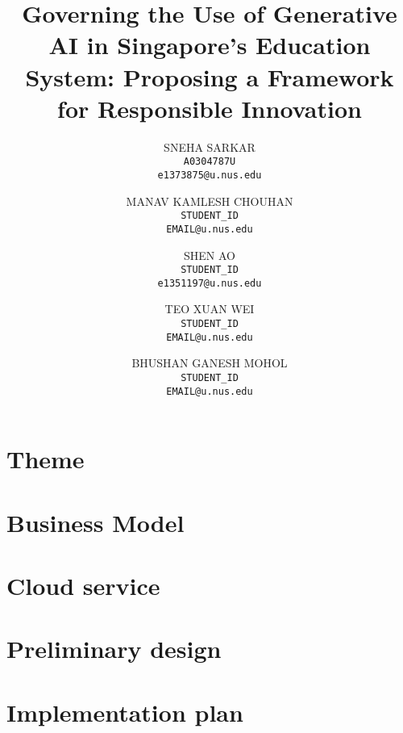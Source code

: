 \documentclass[11pt]{article}
\title{Governing the Use of Generative AI in Singapore's Education System: Proposing a Framework for Responsible Innovation
}
\author{
    \begin{tabular}[t]{l}
        SNEHA SARKAR \\
        \texttt{A0304787U} \\
        \texttt{e1373875@u.nus.edu} \\
    \end{tabular}
    \and
    \begin{tabular}[t]{l}
        MANAV KAMLESH CHOUHAN \\
        \texttt{STUDENT\_ID} \\
        \texttt{EMAIL@u.nus.edu} \\
    \end{tabular}
    \and
    \begin{tabular}[t]{l}
        SHEN AO \\
        \texttt{STUDENT\_ID} \\
        \texttt{e1351197@u.nus.edu} \\
    \end{tabular}
    \and
    \begin{tabular}[t]{l}
        TEO XUAN WEI \\
        \texttt{STUDENT\_ID} \\
        \texttt{EMAIL@u.nus.edu} \\
    \end{tabular}
    \and
    \begin{tabular}[t]{l}
        BHUSHAN GANESH MOHOL \\
        \texttt{STUDENT\_ID} \\
        \texttt{EMAIL@u.nus.edu}
    \end{tabular}
}
\begin{document}
\maketitle

\section{Theme}
\section{Business Model}
\section{Cloud service}
\section{Preliminary design}
\section{Implementation plan}
\end{document}
